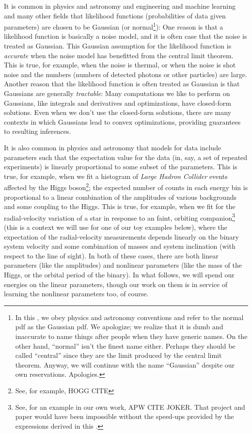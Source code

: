It is common in physics and astronomy and engineering and machine learning and many other fields that likelihood functions
(probabilities of data given parameters) are chosen to be Gaussian
(or normal\footnote{In this \documentname, we obey physics and astronomy
  conventions and refer to the normal pdf as the Gaussian pdf. We apologize;
  we realize that it is dumb and inaccurate to name things after people when
  they have generic names. On the other hand, ``normal'' isn't the finest
  name either. Perhaps they should be called ``central'' since they are the
  limit produced by the central limit theorem. Anyway, we will continue with
  the name ``Gaussian'' despite our own reservations. Apologies.}):
One reason is that a likelihood function is basically a noise model,
and it is often case that the noise is treated as Gaussian.
This Gaussian assumption for the likelihood function is
\emph{accurate} when the noise model has benefitted from the central
limit theorem.
This is true, for example, when the noise is thermal, or when the
noise is shot noise and the numbers (numbers of detected photons or other
particles) are large.
Another reason that the likelihood function is often treated as
Gaussian is that Gaussians are generally \emph{tractable}:
Many computations we like to perform on Gaussians, like integrals and
derivatives and optimizations, have closed-form solutions.
Even when we don't use the closed-form solutions, there are many
contexts in which Gaussians lead to convex optimizations,
providing guarantees to resulting inferences.

It is also common in physics and astronomy that models for data
include parameters such that the expectation value for the data (in,
say, a set of repeated experiments) is linearly proportional to some
subset of the parameters.
This is true, for example, when we fit a histogram of \textsl{Large Hadron Collider}
events
affected by the Higgs boson\footnote{See, for example, HOGG CITE};
the expected number of counts in each
energy bin is proportional to a linear combination of the amplitudes
of various backgrounds and some coupling to the Higgs.
This is true, for example, when we fit for the radial-velocity
variation of a star in response to an faint, orbiting companion\footnote{See,
  for an example in our own work, APW CITE JOKER. That project and paper would have been
  impossible without the speed-ups provided by the expressions derived in this
  \documentname.} (this is a context
we will use for one of our toy examples below), where the expectation of the
radial-velocity measurements depends linearly on the binary system
velocity and some combination of masses and system inclination (with
respect to the line of sight).
In both of these cases, there are both linear parameters (like the
amplitudes) and nonlinear parameters (like the mass of the Higgs, or
the orbital period of the binary).
In what follows, we will spend our energies on the linear parameters,
though our work on them is in service of learning the nonlinear
parameters too, of course.

